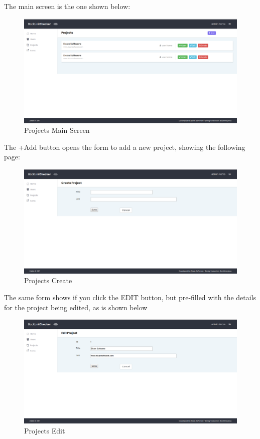 The main screen is the one shown below:
\begin{figure}[H]
	\caption{Projects Main Screen}
	\label{img:prjmain}
	\includegraphics[width=\textwidth]{images/projects_screenshot}
\end{figure}

The +Add button opens the form to add a new project, showing the following page:
\begin{figure}[H]
	\caption{Projects Create}
	\label{img:prjcreate}
	\includegraphics[width=\textwidth]{images/project_create}
\end{figure}

The same form shows if you click the EDIT button, but pre-filled with the details for the project being edited, as is shown below
\begin{figure}[H]
	\caption{Projects Edit}
	\label{img:prjedit}
	\includegraphics[width=\textwidth]{images/project_edit}
\end{figure}

